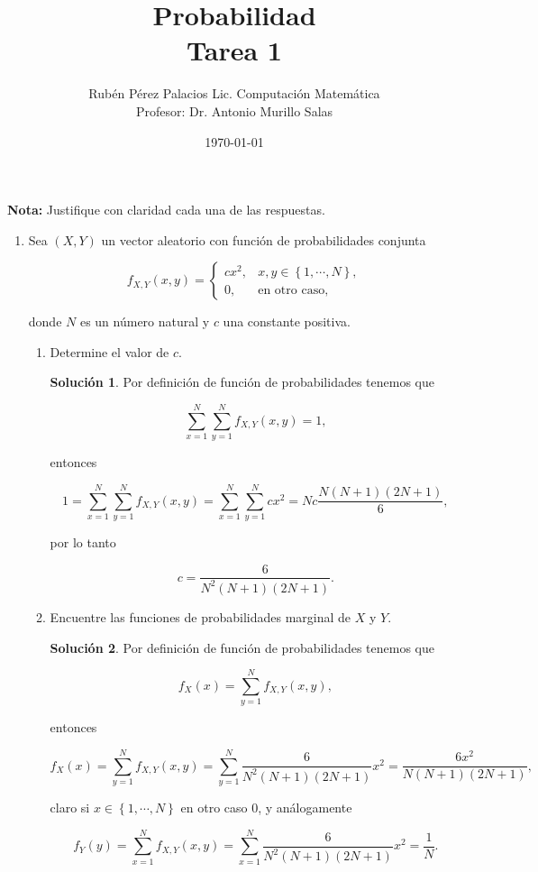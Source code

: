 \documentclass[letterpaper]{article}
\title{Probabilidad \\ Tarea 1}
\author{Rubén Pérez Palacios Lic. Computación Matemática\\Profesor: Dr. Antonio Murillo Salas}
\date{\today}
\theoremstyle{definition}
\theoremstyle{lemathm}
\theoremstyle{lemathm}
\newtheorem{sol}{Solución}
\theoremstyle{lemathm}
\theoremstyle{lemademthm}
\newcommand{\pars}[1]{\left( #1 \right) }
\newcommand{\set}[1]{\left \{ #1 \right\} }
\newcommand{\1}{\mathbbm{1}}
\begin{document}
	\maketitle

	\textbf{Nota:} Justifique con claridad cada una de las respuestas.

	\begin{enumerate}
		\item Sea $\pars{X,Y}$ un vector aleatorio con función de probabilidades conjunta
		
		\[f_{X,Y}(x,y) = \begin{cases}
			cx^2, &x,y\in\set{1,\cdots,N},\\
			0, &\text{en otro caso},
		\end{cases}\]

		donde $N$ es un número natural y $c$ una constante positiva.

		\begin{enumerate}
			\item Determine el valor de $c$.
			
			\begin{sol}
				Por definición de función de probabilidades tenemos que

				\[\sum_{x=1}^N\sum_{y=1}^N f_{X,Y}(x,y) = 1,\]

				entonces

				\[1 = \sum_{x=1}^N\sum_{y=1}^N f_{X,Y}(x,y) = \sum_{x=1}^N\sum_{y=1}^N cx^2 = Nc \frac{N(N+1)(2N+1)}{6},\]

				por lo tanto

				\[c = \frac{6}{N^2(N+1)(2N+1)}.\]
			\end{sol}

			\item Encuentre las funciones de probabilidades marginal de $X$ y $Y$.
			
			\begin{sol}
				Por definición de función de probabilidades tenemos que

				\[f_X(x) = \sum_{y=1}^N f_{X,Y}(x,y),\]

				entonces

				\[f_X(x) = \sum_{y=1}^N f_{X,Y}(x,y) = \sum_{y=1}^N \frac{6}{N^2(N+1)(2N+1)}x^2 = \frac{6x^2}{N(N+1)(2N+1)},\]

				claro si $x \in \set{1,\cdots,N}$ en otro caso $0$, y análogamente

				\[f_Y(y) = \sum_{x=1}^N f_{X,Y}(x,y) = \sum_{x=1}^N \frac{6}{N^2(N+1)(2N+1)}x^2 = \frac{1}{N}.\]


\end{sol}
\end{enumerate}
\end{enumerate}
\end{document}
